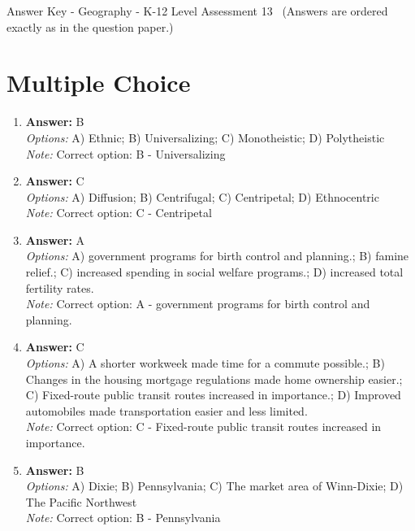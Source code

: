 \documentclass[12pt]{article}
\begin{document}
\begin{center}
Answer Key - Geography - K-12 Level Assessment 13 \
\small (Answers are ordered exactly as in the question paper.)
\end{center}

\section*{Multiple Choice}
\begin{enumerate}[label=\arabic*.]
\item \textbf{Answer:} B
\\ \textit{Options:} A) Ethnic; B) Universalizing; C) Monotheistic; D) Polytheistic
\\ \textit{Note:} Correct option: B - Universalizing
\item \textbf{Answer:} C
\\ \textit{Options:} A) Diffusion; B) Centrifugal; C) Centripetal; D) Ethnocentric
\\ \textit{Note:} Correct option: C - Centripetal
\item \textbf{Answer:} A
\\ \textit{Options:} A) government programs for birth control and planning.; B) famine relief.; C) increased spending in social welfare programs.; D) increased total fertility rates.
\\ \textit{Note:} Correct option: A - government programs for birth control and planning.
\item \textbf{Answer:} C
\\ \textit{Options:} A) A shorter workweek made time for a commute possible.; B) Changes in the housing mortgage regulations made home ownership easier.; C) Fixed-route public transit routes increased in importance.; D) Improved automobiles made transportation easier and less limited.
\\ \textit{Note:} Correct option: C - Fixed-route public transit routes increased in importance.
\item \textbf{Answer:} B
\\ \textit{Options:} A) Dixie; B) Pennsylvania; C) The market area of Winn-Dixie; D) The Pacific Northwest
\\ \textit{Note:} Correct option: B - Pennsylvania
\end{enumerate}
\end{document}
